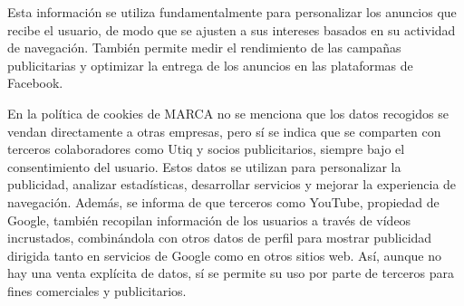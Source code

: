 Esta información se utiliza fundamentalmente para personalizar los anuncios que recibe el usuario, de modo que se ajusten a sus intereses basados en su actividad de navegación. También permite medir el rendimiento de las campañas publicitarias y optimizar la entrega de los anuncios en las plataformas de Facebook.

En la política de cookies de MARCA no se menciona que los datos recogidos se vendan directamente a otras empresas, pero sí se indica que se comparten con terceros colaboradores como Utiq y socios publicitarios, siempre bajo el consentimiento del usuario. Estos datos se utilizan para personalizar la publicidad, analizar estadísticas, desarrollar servicios y mejorar la experiencia de navegación. Además, se informa de que terceros como YouTube, propiedad de Google, también recopilan información de los usuarios a través de vídeos incrustados, combinándola con otros datos de perfil para mostrar publicidad dirigida tanto en servicios de Google como en otros sitios web. Así, aunque no hay una venta explícita de datos, sí se permite su uso por parte de terceros para fines comerciales y publicitarios.
